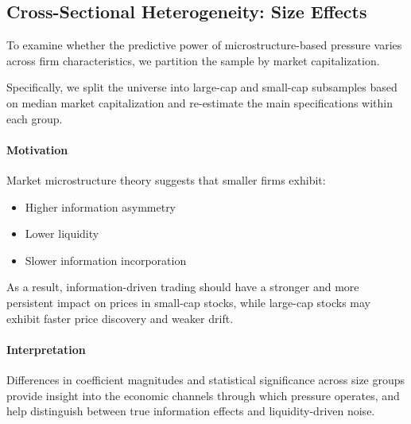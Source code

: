 \subsection{Cross-Sectional Heterogeneity: Size Effects}

To examine whether the predictive power of microstructure-based pressure varies across firm characteristics, we partition the sample by market capitalization.

Specifically, we split the universe into large-cap and small-cap subsamples based on median market capitalization and re-estimate the main specifications within each group.

\paragraph{Motivation}

Market microstructure theory suggests that smaller firms exhibit:
\begin{itemize}
    \item Higher information asymmetry
    \item Lower liquidity
    \item Slower information incorporation
\end{itemize}

As a result, information-driven trading should have a stronger and more persistent impact on prices in small-cap stocks, while large-cap stocks may exhibit faster price discovery and weaker drift.

\paragraph{Interpretation}

Differences in coefficient magnitudes and statistical significance across size groups provide insight into the economic channels through which pressure operates, and help distinguish between true information effects and liquidity-driven noise.
